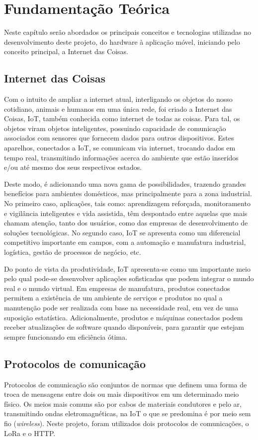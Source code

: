 \chapter{Fundamentação Teórica}
\label{cap:fundamentacao}
Neste capítulo serão abordados os principais conceitos e tecnologias utilizadas no desenvolvimento deste projeto, do hardware à aplicação móvel, iniciando pelo conceito principal, a Internet das Coisas.

\section{Internet das Coisas}
\label{fund:iot}
Com o intuito de ampliar a internet atual, interligando os objetos do nosso cotidiano, animais e humanos em uma única rede, foi criado a Internet das Coisas, IoT, também conhecida como internet de todas as coisas. Para tal, os objetos viram objetos inteligentes, possuindo capacidade de comunicação associados com sensores que fornecem dados para outros dispositivos. Estes aparelhos, conectados a IoT, se comunicam via internet, trocando dados em tempo real, transmitindo informações acerca do ambiente que estão inseridos e/ou até mesmo dos seus respectivos estados. 

Deste modo, é adicionando uma nova gama de possibilidades, trazendo grandes benefícios para ambientes domésticos, mas principalmente para a zona industrial. No primeiro caso, aplicações, tais como: aprendizagem reforçada, monitoramento e vigilância inteligentes e vida assistida, têm despontado entre aquelas que mais chamam atenção, tanto dos usuários, como das empresas de desenvolvimento de soluções tecnológicas. No segundo caso, IoT se apresenta como um diferencial competitivo importante em campos, com a automação e manufatura industrial, logística, gestão de processos de negócio, etc.

Do ponto de vista da produtividade, IoT apresenta-se como um importante meio pelo qual pode-se desenvolver aplicações sofisticadas que podem integrar o mundo real e o mundo virtual. Em empresas de manufatura, produtos conectados permitem a existência de um ambiente de serviços e produtos no qual a manutenção pode ser realizada com base na necessidade real, em vez de uma suposição estatística. Adicionalmente, produtos e máquinas conectados podem receber atualizações de software quando disponíveis, para garantir que estejam sempre funcionando em eficiência ótima.

\section{Protocolos de comunicação}
\label{fund:protocolos}
Protocolos de comunicação são conjuntos de normas que definem uma forma de troca de mensagens entre dois ou mais dispositivos em um determinado meio físico. Os meios mais comuns são por cabos de materiais condutores e pelo ar, transmitindo ondas eletromagnéticas, na IoT o que se predomina é por meio sem fio (\textit{wireless}). Neste projeto, foram utilizados dois protocolos de comunicações, o LoRa e o HTTP.

